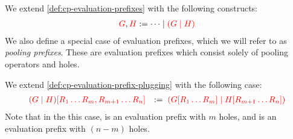 \begin{definition}\label{def:nc-evaluation-prefixes}
  We extend \cref{def:cp-evaluation-prefixes} with the following constructs:
  \begin{align*}
    \textcolor{red}{G}, \textcolor{red}{H} := \dots \mid \textcolor{red}{(G \mid H)}
  \end{align*}
  We also define a special case of evaluation prefixes, which we will refer to
  as \emph{pooling prefixes}. These are evaluation prefixes which consist solely
  of pooling operators and holes. 
\end{definition}
\begin{definition}[Plugging]\label{def:nc-evaluation-prefix-plugging}
  We extend \cref{def:cp-evaluation-prefix-plugging} with the following case:
  \[
    \begin{array}{ll}
      \textcolor{red}{{(G \mid H)}[{R_1 \dots R_m, R_{m+1} \dots R_{n}}]}
                            & := \; \textcolor{red}{({G}[{R_1 \dots R_m}] \mid {H}[{R_{m+1} \dots R_n}])}
    \end{array}
  \]
  Note that in the this case,  is an evaluation prefix with $m$ holes,
  and  is an evaluation prefix with $(n-m)$ holes.
\end{definition}
